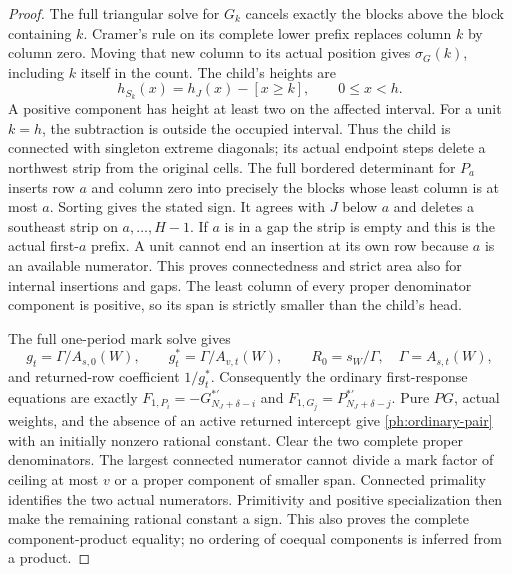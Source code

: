 \documentclass[11pt,a4paper]{amsart}
\numberwithin{equation}{section}
\theoremstyle{plain}
\theoremstyle{definition}
\begin{document}
\begin{proof}
The full triangular solve for \(G_k\) cancels exactly the blocks above
the block containing \(k\).  Cramer's rule on its complete lower prefix
replaces column \(k\) by column zero.  Moving that new column to its actual
position gives \(\sigma_G(k)\), including \(k\) itself in the count.
The child's heights are
\[
 h_{S_k}(x)=h_J(x)-[x\ge k],\qquad 0\le x<h.
\]
A positive component has height at least two on the affected interval.
For a unit \(k=h\), the subtraction is outside the occupied interval.
Thus the child is connected with singleton extreme diagonals; its actual
endpoint steps delete a northwest strip from the original cells.
The full bordered determinant for \(P_a\) inserts row \(a\) and column
zero into precisely the blocks whose least column is at most \(a\).
Sorting gives the stated sign.  It agrees with \(J\) below \(a\) and
deletes a southeast strip on \(a,\ldots,H-1\).
If \(a\) is in a gap the strip is empty and this is the actual first-\(a\)
prefix.  A unit cannot end an insertion at its own row because \(a\)
is an available numerator.  This proves connectedness and strict area
also for internal insertions and gaps.  The least column of every
proper denominator component is positive, so its span is strictly
smaller than the child's head.

The full one-period mark solve gives
\[
 g_t=\Gamma/A_{s,0}(W),\qquad
 g_t^*=\Gamma/A_{v,t}(W),\qquad
 R_0=s_W/\Gamma,\quad \Gamma=A_{s,t}(W),
\]
and returned-row coefficient \(1/g_t^*\).
Consequently the ordinary first-response equations are exactly
\(F_{1,P_i}=-G^{*'}_{N_J+\delta-i}\) and
\(F_{1,G_j}=P^{*'}_{N_J+\delta-j}\).
Pure \(PG\), actual weights, and the absence of an active returned
intercept give \eqref{ph:ordinary-pair} with an initially nonzero rational
constant.  Clear the two complete proper denominators.
The largest connected numerator cannot divide a mark factor of ceiling
at most \(v\) or a proper component of smaller span.  Connected
primality identifies the two actual numerators.  Primitivity and positive
specialization then make the remaining rational constant a sign.
This also proves the complete component-product equality; no ordering
of coequal components is inferred from a product.


\end{proof}
\end{document}
